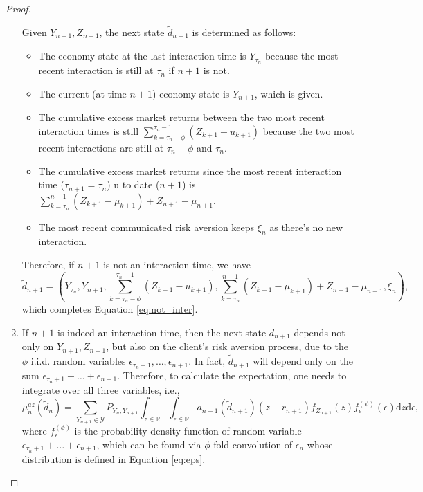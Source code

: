 \begin{proof}
\begin{enumerate}
    Given $Y_{n+1}, Z_{n+1}$, the next state $\tilde d_{n+1}$ is determined as follows:\begin{itemize}
        \item The economy state at the last interaction time is $Y_{\tau_n}$ because the most recent interaction is still at $\tau_n$ if $n+1$ is not.
        \item The current (at time $n+1$) economy state is $Y_{n+1}$, which is given.
        \item The cumulative excess market returns between the two most recent interaction times is still $\sum_{k=\tau_n-\phi}^{\tau_n-1}(Z_{k+1}-u_{k+1})$ because the two most recent interactions are still at $\tau_n-\phi$ and $\tau_n$.
        \item The cumulative excess market returns since the most recent interaction time ($\tau_{n+1}=\tau_n$) u to date ($n+1$) is $\sum_{k=\tau_n}^{n-1}(Z_{k+1}-\mu_{k+1}) + Z_{n+1}-\mu_{n+1}$.
        \item The most recent communicated risk aversion keeps $\xi_n$ as there's no new interaction.
    \end{itemize}

    Therefore, if $n+1$ is not an interaction time, we have \begin{equation}
        \label{eq:dn+1_not_inter}
        \tilde d_{n+1}=
    (Y_{\tau_n}, Y_{n+1}, \sum_{k=\tau_n-\phi}^{\tau_n-1}(Z_{k+1}-u_{k+1}), \sum_{k=\tau_n}^{n-1}(Z_{k+1}-\mu_{k+1}) + Z_{n+1}-\mu_{n+1}, \xi_n),
    \end{equation} which completes Equation \eqref{eq:not_inter}.

    \item If $n+1$ is indeed an interaction time, then the next state $\tilde d_{n+1}$ depends not only on $Y_{n+1}, Z_{n+1}$, but also on the client's risk aversion process, due to the $\phi$ i.i.d. random variables $\epsilon_{\tau_n+1},\ldots,\epsilon_{n+1}$. In fact, $\tilde d_{n+1}$ will depend only on the sum  $\epsilon_{\tau_n+1}+\ldots+\epsilon_{n+1}$. Therefore, to calculate the expectation, one needs to integrate over all three variables, i.e., \begin{equation}
        \label{eq:inter}
        \mu_n^{az}(\tilde d_n)=\sum_{Y_{n+1}\in\mathcal Y}P_{Y_{n},Y_{n+1}} \int_{z\in\mathbb{R}} \int_{\epsilon\in\mathbb{R}} {a_{n+1}(\tilde d_{n+1})}(z-r_{n+1})f_{Z_{n+1}}(z)f_\epsilon^{(\phi)}(\epsilon)\mathrm{d}z\mathrm d\epsilon,
    \end{equation} where $f_\epsilon^{(\phi)}$ is the probability density function of random variable $\epsilon_{\tau_n+1}+\ldots+\epsilon_{n+1}$, which can be found via $\phi$-fold convolution of $\epsilon_n$ whose distribution is defined in Equation \eqref{eq:eps}.


\end{enumerate}
\end{proof}
